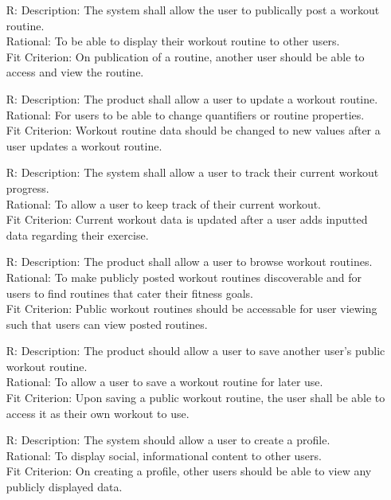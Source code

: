 \documentclass[12pt]{article}
\newcounter{reqnum} %
\begin{document}
\begin{itemize}
\begin{itemize}
		\item[R\refstepcounter{reqnum}\thereqnum \label{R_Inputs}:]
		Description: The system shall allow the user to publically post a workout
		routine.
		\\ Rational: To be able to display their workout routine to other users.
		\\ Fit Criterion: On publication of a routine, another user should be able to
		access and view the routine.
		
		\item[R\refstepcounter{reqnum}\thereqnum \label{R_Inputs}:]
		Description: The product shall allow a user to update a workout routine.
		\\ Rational: For users to be able to change quantifiers or routine properties.
		\\ Fit Criterion: Workout routine data should be changed to new values after a user updates a workout routine.
		
		\item[R\refstepcounter{reqnum}\thereqnum \label{R_Inputs}:]
		Description: The system shall allow a user to track their current workout progress.
		\\ Rational: To allow a user to keep track of their current workout.
		\\ Fit Criterion: Current workout data is updated after a user adds inputted data regarding their exercise.
		
		\item[R\refstepcounter{reqnum}\thereqnum \label{R_Inputs}:]
		Description: The product shall allow a user to browse workout routines.
		\\ Rational: To make publicly posted workout routines discoverable and for users to find routines that cater their fitness goals.
		\\ Fit Criterion: Public workout routines should be accessable for user viewing such that users can view posted routines.
		
		\item[R\refstepcounter{reqnum}\thereqnum \label{R_Inputs}:]
		Description: The product should allow a user to save another user's public workout routine.
		\\ Rational: To allow a user to save a workout routine for later use.
		\\ Fit Criterion: Upon saving a public workout routine, the user shall be able to access it as their own workout to use.
		
		\item[R\refstepcounter{reqnum}\thereqnum \label{R_Inputs}:]
		Description: The system should allow a user to create a profile.
		\\ Rational: To display social, informational content to other users.
		\\ Fit Criterion: On creating a profile, other users should be able to view any publicly displayed data.
		

\end{itemize}
\end{itemize}
\end{document}

